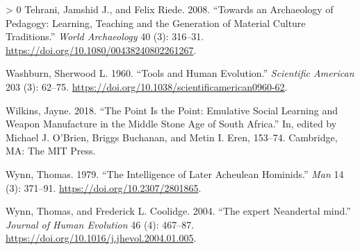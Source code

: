 \documentclass[smallextended]{svjour3}       %
\newlength{\cslhangindent}
\newenvironment{CSLReferences}[3] %
 {%
  \setlength{\parindent}{0pt}
  \ifodd #1 \everypar{\setlength{\hangindent}{\cslhangindent}}\ignorespaces\fi
  \ifnum #2 > 0
  \setlength{\parskip}{#3\baselineskip}
  \fi
 }%
 {}
\begin{document}
\begin{CSLReferences}{1}{0}
\leavevmode\hypertarget{ref-tehrani2008}{}%
Tehrani, Jamshid J., and Felix Riede. 2008. {``Towards an Archaeology of
Pedagogy: Learning, Teaching and the Generation of Material Culture
Traditions.''} \emph{World Archaeology} 40 (3): 316--31.
\url{https://doi.org/10.1080/00438240802261267}.

\leavevmode\hypertarget{ref-washburn1960}{}%
Washburn, Sherwood L. 1960. {``Tools and Human Evolution.''}
\emph{Scientific American} 203 (3): 62--75.
\url{https://doi.org/10.1038/scientificamerican0960-62}.

\leavevmode\hypertarget{ref-wilkins2018}{}%
Wilkins, Jayne. 2018. {``The Point Is the Point: Emulative Social
Learning and Weapon Manufacture in the Middle Stone Age of South
Africa.''} In, edited by Michael J. O'Brien, Briggs Buchanan, and Metin
I. Eren, 153--74. Cambridge, MA: The MIT Press.

\leavevmode\hypertarget{ref-wynn1979}{}%
Wynn, Thomas. 1979. {``The Intelligence of Later Acheulean Hominids.''}
\emph{Man} 14 (3): 371--91. \url{https://doi.org/10.2307/2801865}.

\leavevmode\hypertarget{ref-wynn2004}{}%
Wynn, Thomas, and Frederick L. Coolidge. 2004. {``The expert Neandertal
mind.''} \emph{Journal of Human Evolution} 46 (4): 467--87.
\url{https://doi.org/10.1016/j.jhevol.2004.01.005}.

\end{CSLReferences}



\end{document}
